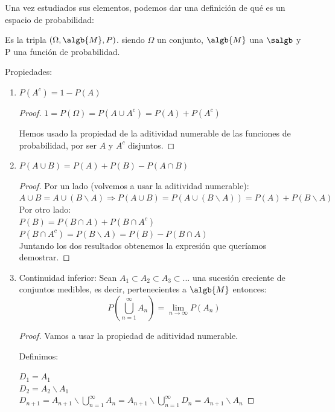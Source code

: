 \documentclass{apuntes}
\begin{document}
Una vez estudiados sus elementos, podemos dar una definición de qué es un espacio de probabilidad:

\begin{defn} Es la tripla $(\Omega, \algb{M}, P)$. siendo $\Omega$ un conjunto, $\algb{M}$ una $\salgb$ y P una función de probabilidad.
\end{defn}

Propiedades:
\begin{enumerate}
\item $P(A^c) = 1-P(A)$
\begin{proof}
$1=P(\Omega)=P(A \cup A^c) = P(A) + P(A^c)$ 

Hemos usado la propiedad de la aditividad numerable de las funciones de probabilidad, por ser $A$ y $A^c$ disjuntos.
\end{proof} 
\item $P(A \cup B) = P(A) + P(B) - P(A \cap B)$
\begin{proof}

Por un lado (volvemos a usar la aditividad numerable):\\
$A \cup B = A \cup (B \backslash A) \Rightarrow P(A \cup B) = P(A \cup (B \backslash A)) = P(A) + P(B \backslash A)$\\

Por otro lado:\\
$P(B) = P(B \cap A) + P(B \cap A^c)$\\
$P(B \cap A^c) = P(B \backslash A) = P(B) - P(B \cap A)$ \\

Juntando los dos resultados obtenemos la expresión que queríamos demostrar.
\end{proof}

\item Continuidad inferior: Sean $A_1 \subset A_2 \subset A_3 \subset ...$ una sucesión creciente de conjuntos medibles, es decir, pertenecientes a $\algb{M}$ entonces:
\[ P(\bigcup_{n=1}^{\infty}A_n) = \lim_{n \rightarrow \infty} P(A_n)
\]


\begin{proof}
Vamos a usar la propiedad de aditividad numerable.

Definimos:

$D_1=A_1$\\
$D_2=A_2 \backslash A_1$\\
$D_{n+1}=A_{n+1} \backslash \bigcup_{n=1}^{\infty}A_n=A_{n+1} \backslash \bigcup_{n=1}^{\infty}D_n=A_{n+1} \backslash A_n$


\end{proof}
\end{enumerate}
\end{document}
